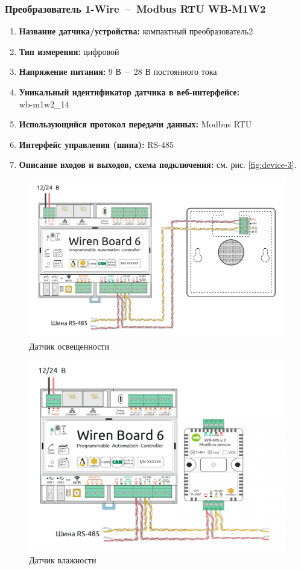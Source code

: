 \documentclass[a4paper,14pt]{extarticle}
\begin{document}
\subsubsection*{Преобразователь 1-Wire~--~Modbus RTU WB-M1W2}
\begin{enumerate}
	\item \textbf{Название датчика/устройства:} компактный преобразователь2
	
	\item \textbf{Тип измерения:} цифровой
	
	\item  \textbf{Напряжение питания:} 9 В~--~28 В постоянного тока
	
	\item  \textbf{Уникальный идентификатор датчика в веб-интерфейсе:}\\ wb-m1w2\_14
	
	\item  \textbf{Использующийся протокол передачи данных:} Modbus RTU
	
	\item  \textbf{Интерфейс управления (шина):} RS-485
	
	\item  \textbf{Описание входов и выходов, схема подключения:} см. рис. \ref{fig:device-3}.
	
\end{enumerate}

\begin{figure}[h!]
	\centering
	\includegraphics[width=0.5\linewidth]{images/device-1}
	\caption{Датчик освещенности}
	\label{fig:device-1}
\end{figure}

\begin{figure}[h!]
	\centering
	\includegraphics[width=0.5\linewidth]{images/device-2}
	\caption{Датчик влажности}
	\label{fig:device-2}
\end{figure}
\end{document}
